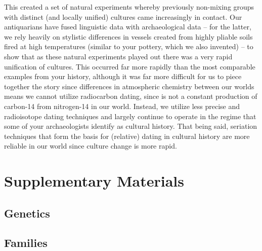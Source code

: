 \documentclass{report}
\begin{document}
This created a set of natural experiments whereby previously non-mixing groups with distinct (and locally unified) cultures came increasingly in contact. Our antiquarians have fused linguistic data with archaeological data -- for the latter, we rely heavily on stylistic differences in vessels created from highly pliable soils fired at high temperatures (similar to your pottery, which we also invented) -- to show that as these natural experiments played out there was a very rapid unification of cultures. This occurred far more rapidly than the most comparable examples from your history, although it was far more difficult for us to piece together the story since differences in atmospheric chemistry between our worlds means we cannot utilize radiocarbon dating, since is not a constant production of carbon-14 from nitrogen-14 in our world. Instead, we utilize less precise and radioisotope dating techniques and largely continue to operate in the regime that some of your archaeologists identify as cultural history. That being said, seriation techniques that form the basis for (relative) dating in cultural history are more reliable in our world since culture change is more rapid.

\chapter*{Supplementary Materials}







%



\section{Genetics}
%




\section{Families}

\end{document}
